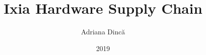 \title{Ixia Hardware Supply Chain}
\author{Adriana Dincă}
\date{2019}



\newcommand{\project}{Hardware Supply Chain on Blockchain}

